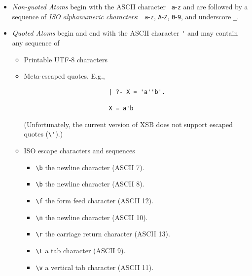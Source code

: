 \begin{itemize}
\item {\em Non-guoted Atoms} begin with the ASCII character {\tt
  a}-{\tt z} and are followed by a sequence of {\em ISO alphanumeric characters}: {\tt
  a}-{\tt z}, {\tt A}-{\tt Z}, {\tt 0}-{\tt 9}, and underscore {\tt \_}.
%
\item {\em Quoted Atoms} begin and end with the ASCII character \verb|'| and may contain any sequence of 
\begin{itemize}
\item Printable UTF-8 characters

\item Meta-escaped quotes.  E.g., 
\begin{verbatim}
                        | ?- X = 'a''b'.

                        X = a'b
\end{verbatim}
(Unfortunately, the current version of XSB does not support escaped
quotes (\verb|\'|).)
\item ISO escape characters and sequences
\begin{itemize}
\item \verb|\b| the newline character (ASCII 7).

\item \verb|\b| the newline character (ASCII 8).

\item \verb|\f| the form feed character (ASCII 12).

\item \verb|\n| the newline character (ASCII 10).

\item \verb|\r| the carriage return character (ASCII 13).

\item \verb|\t| a tab character (ASCII 9).

\item \verb|\v| a vertical tab character (ASCII 11).


\end{itemize}
\end{itemize}
\end{itemize}
